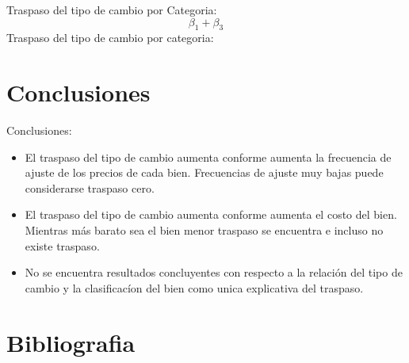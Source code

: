 \documentclass[xcolor=dvipsnames]{beamer}
\begin{document}
\begin{frame}
Traspaso del tipo de cambio por Categoria:\\
\begin{equation}
\beta_{1} + \beta_{3}
\end{equation}
Traspaso del tipo de cambio por categoria:\\
\begin{table}[!htbp] \centering  
{}
\end{table} 
\end{frame}

\section{Conclusiones}
\begin{frame}
Conclusiones: \\
\begin{itemize}
	\item El traspaso del tipo de cambio aumenta conforme aumenta la frecuencia de ajuste de los precios de cada bien. Frecuencias de ajuste muy bajas puede considerarse traspaso cero.\\
	\item El traspaso del tipo de cambio aumenta conforme aumenta el costo del bien. Mientras más barato sea el bien menor traspaso se encuentra e incluso no existe traspaso. \\
	\item No se encuentra resultados concluyentes con respecto a la relaci\'on del tipo de cambio y la clasificac\'ion del bien como unica explicativa del traspaso.
\end{itemize} 
\end{frame}

\section{Bibliografia}
\end{document}
